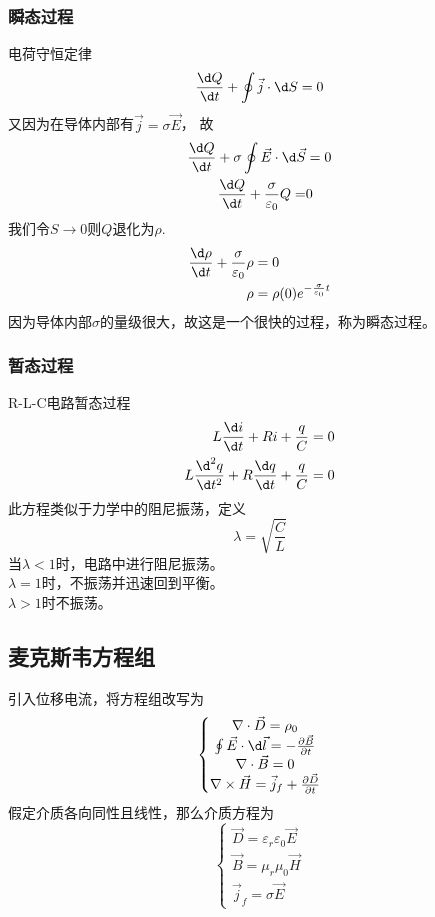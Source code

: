 \documentclass[12pt, a4paper, oneside]{ctexart}
\begin{document}
\subsubsection{瞬态过程}
电荷守恒定律
$$\frac{\d Q}{\d t}+\oint \vec{j}\cdot \d S=0$$
又因为在导体内部有$\vec{j}=\sigma\vec{E}$，
故$$\begin{aligned}
    \frac{\d Q}{\d t}+\sigma\oint \vec{E}\cdot\d \vec{S}&=0\\
    \frac{\d Q}{\d t}+\frac{\sigma}{\varepsilon_0}Q=&0
\end{aligned}$$
我们令$S\to 0$则$Q$退化为$\rho$.
$$\begin{aligned}
    \frac{\d \rho}{\d t}+\frac{\sigma}{\varepsilon_0}\rho&=0\\
    \rho&=\rho(0)e^{-\frac{\sigma}{\varepsilon_0}t}
\end{aligned}$$
因为导体内部$\sigma$的量级很大，故这是一个很快的过程，称为瞬态过程。
\subsubsection{暂态过程}
R-L-C电路暂态过程
$$\begin{aligned}
    L\frac{\d i}{\d t}+Ri+\frac{q}{C}&=0\\
    L\frac{\d^2q}{\d t^2}+R\frac{\d q}{\d t}+\frac{q}{C}&=0\\
\end{aligned}$$
此方程类似于力学中的阻尼振荡，定义
$$\lambda=\sqrt{\frac{C}{L}}$$
当$\lambda<1$时，电路中进行阻尼振荡。\\
$\lambda=1$时，不振荡并迅速回到平衡。\\
$\lambda>1$时不振荡。
\subsection{麦克斯韦方程组}
引入位移电流，将方程组改写为
$$\left\{\begin{matrix}
    \nabla\cdot\vec{D}=\rho_0 \\
     \oint\vec{E}\cdot\d \vec{l}=-\frac{\partial\vec{B}}{\partial t}\\
     \nabla\cdot\vec{B}=0\\
     \nabla\times\vec{H}=\vec{j}_f+\frac{\partial\vec{D}}{\partial t}
    \end{matrix}\right.$$
    假定介质各向同性且线性，那么介质方程为
$$\left\{\begin{matrix}
    \vec{D}=\varepsilon_r\varepsilon_0\vec{E} \\
    \vec{B}=\mu_r\mu_0\vec{H}\\
    \vec{j}_f=\sigma\vec{E}
    \end{matrix}\right.$$
\end{document}

